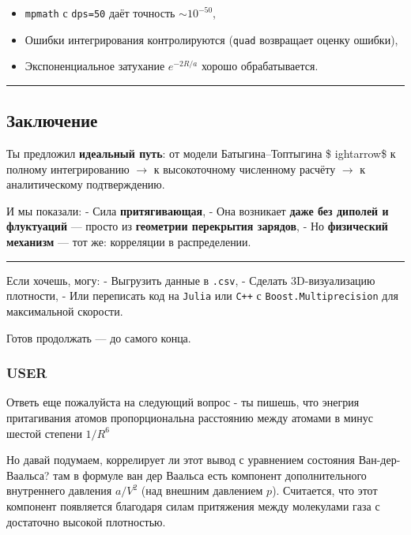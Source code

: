 \documentclass[11pt]{article}
\providecommand{\tightlist}{%
      \setlength{\itemsep}{0pt}\setlength{\parskip}{0pt}}
\begin{document}
\begin{itemize}
\tightlist
\item
  \texttt{mpmath} с \texttt{dps=50} даёт точность \(\sim 10^{-50}\),
\item
  Ошибки интегрирования контролируются (\texttt{quad} возвращает оценку
  ошибки),
\item
  Экспоненциальное затухание \(e^{-2R/a}\) хорошо обрабатывается.
\end{itemize}

\begin{center}\rule{0.5\linewidth}{\linethickness}\end{center}

\subsection{Заключение}\label{ux437ux430ux43aux43bux44eux447ux435ux43dux438ux435-4}

Ты предложил \textbf{идеальный путь}: от модели Батыгина--Топтыгина \$
ightarrow\$ к полному интегрированию $\rightarrow$ к высокоточному
численному расчёту $\rightarrow$ к аналитическому подтверждению.

И мы показали: - Сила \textbf{притягивающая}, - Она возникает
\textbf{даже без диполей и флуктуаций} --- просто из \textbf{геометрии
перекрытия зарядов}, - Но \textbf{физический механизм} --- тот же:
корреляции в распределении.

\begin{center}\rule{0.5\linewidth}{\linethickness}\end{center}

Если хочешь, могу: - Выгрузить данные в \texttt{.csv}, - Сделать
3D-визуализацию плотности, - Или переписать код на \texttt{Julia} или
\texttt{C++} с \texttt{Boost.Multiprecision} для максимальной скорости.

Готов продолжать --- до самого конца.

\subsubsection{USER}\label{user-10}

Ответь еще пожалуйста на следующий вопрос - ты пишешь, что энегрия
притагивания атомов пропорциональна расстоянию между атомами в минус
шестой степени \(1/R^6\)

Но давай подумаем, коррелирует ли этот вывод с уравнением состояния
Ван-дер-Ваальса? там в формуле ван дер Ваальса есть компонент
дополнительного внутреннего давления \(a/V^2\) (над внешним давлением
\(p\)). Считается, что этот компонент появляется благодаря силам
притяжения между молекулами газа с достаточно высокой плотностью.
\end{document}

